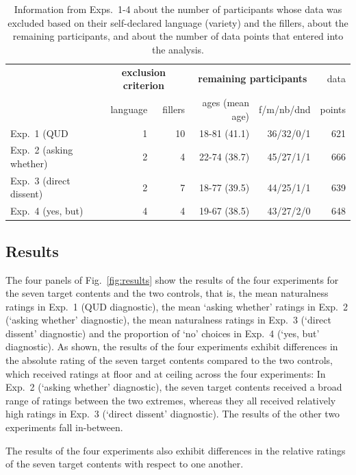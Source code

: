 \documentclass[times,linguex]{glossa}
\begin{document}
  \begin{table}[h!]
  \centering
  \begin{tabular}{l | r r | r r  | r }
               & \multicolumn{2}{c|}{\bf exclusion criterion} & \multicolumn{2}{c|}{\bf remaining participants} & data \\ 
              & language & fillers & ages (mean age) & f/m/nb/dnd &  points \\ \hline
  Exp.~1 (QUD   & 1 &  10 &  18-81 (41.1) & 36/32/0/1 & 621 \\ 
  Exp.~2 (asking whether) &  2 &  4 & 22-74 (38.7) & 45/27/1/1 & 666 \\ 
  Exp.~3  (direct dissent) &  2 &  7 & 18-77 (39.5) & 44/25/1/1  & 639 \\ 
  Exp.~4  (yes, but) & 4 & 4 & 19-67 (38.5)  & 43/27/2/0 & 648 \\ 
  \hline
  \end{tabular}
  \caption{Information from Exps.~1-4 about the number of participants whose data was excluded based on their self-declared language (variety) and the fillers, about the remaining participants, and about the number of data points that entered into the analysis.}\label{t:excluded}
  \end{table}

  \subsection{Results}
  
  The four panels of Fig.~\ref{fig:results} show the results of the four experiments for the seven target contents and the two controls, that is, the mean naturalness ratings in Exp.~1 (QUD diagnostic), the mean `asking whether' ratings in Exp.~2 (`asking whether' diagnostic), the mean naturalness ratings in Exp.~3 (`direct dissent' diagnostic) and the proportion of `no' choices in Exp.~4 (`yes, but' diagnostic). As shown, the results of the four experiments exhibit differences in the absolute rating of the seven target contents compared to the two controls, which received ratings at floor and at ceiling across the four experiments: In Exp.~2 (`asking whether' diagnostic), the seven target contents received a broad range of ratings between the two extremes, whereas they all received relatively high ratings in Exp.~3 (`direct dissent' diagnostic). The results of the other two experiments fall in-between. 
  
  The results of the four experiments also exhibit differences in the relative ratings of the seven target contents with respect to one another.
  
\end{document}
